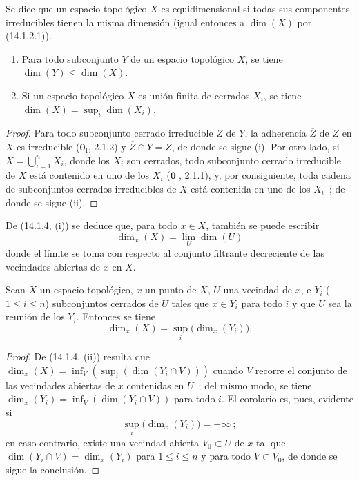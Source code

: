 \begin{definition}[14.1.3]
\label{0.14.1.3-fr}
Se dice que un espacio topológico $X$ es equidimensional si todas sus
componentes irreducibles tienen la misma dimensión \textup{(igual entonces a $\dim(X)$
por (14.1.2.1))}.
\end{definition}

\begin{proposition}[14.1.4]
\label{0.14.1.4-fr}
\begin{enumerate}
  \item[\rm(i)] Para todo subconjunto $Y$ de un espacio topológico $X$, se tiene
  $\dim(Y)\leq\dim(X)$.
  \item[\rm(ii)] Si un espacio topológico $X$ es unión finita de cerrados
  $X_i$, se tiene $\dim(X)=\sup_i\dim(X_i)$.
\end{enumerate}
\end{proposition}

\begin{proof}
Para todo subconjunto cerrado irreducible $Z$ de $Y$, la adherencia $\overline Z$
de $Z$ en $X$ es irreducible ($\mathbf{0}_{\mathrm I}$, 2.1.2) y
$\overline Z\cap Y=Z$, de donde se sigue (i). Por otro lado, si
$X=\bigcup_{i=1}^n X_i$, donde los $X_i$ son cerrados, todo subconjunto cerrado
irreducible de $X$ está contenido en uno de los $X_i$ ($\mathbf{0}_{\mathrm I}$, 2.1.1),
y, por consiguiente, toda cadena de subconjuntos cerrados irreducibles de $X$
está contenida en uno de los $X_i$~; de donde se sigue (ii).
\end{proof}

De (14.1.4, (i)) se deduce que, para todo $x\in X$, también se puede escribir
\[
  \dim_x(X)=\lim_U\dim(U)
  \tag{14.1.4.1}\label{0.14.1.4.1-fr}
\]
donde el límite se toma con respecto al conjunto filtrante decreciente de las
vecindades abiertas de $x$ en $X$.

\begin{corollary}[14.1.5]
\label{0.14.1.5-fr}
Sean $X$ un espacio topológico, $x$ un punto de $X$, $U$ una vecindad de
$x$, e $Y_i$ \textup{($1\leq i\leq n$)} subconjuntos cerrados de $U$ tales que
$x\in Y_i$ para todo $i$ y que $U$ sea la reunión de los $Y_i$. Entonces se tiene
\[
  \dim_x(X)=\sup_i\bigl(\dim_x(Y_i)\bigr).
  \tag{14.1.5.1}\label{0.14.1.5.1-fr}
\]
\end{corollary}

\begin{proof}
De (14.1.4, (ii)) resulta que
$\dim_x(X)=\inf_V(\sup_i(\dim(Y_i\cap V)))$ cuando $V$ recorre el conjunto
de las vecindades abiertas de $x$ contenidas en $U$~; del mismo modo, se tiene
$\dim_x(Y_i)=\inf_V(\dim(Y_i\cap V))$ para todo $i$. El corolario es, pues,
evidente si
\[
  \sup_i\bigl(\dim_x(Y_i)\bigr)=+\infty~;
\]
en caso contrario, existe una vecindad abierta $V_0\subset U$ de $x$ tal
que $\dim(Y_i\cap V)=\dim_x(Y_i)$ para $1\leq i\leq n$ y para todo
$V\subset V_0$, de donde se sigue la conclusión.
\end{proof}

